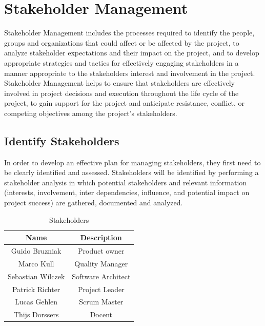 \section{Stakeholder Management}
\label{sec:stakeholders}

Stakeholder Management includes the processes required to identify the people, groups and organizations that could affect or be affected by the project, to analyze stakeholder expectations and their impact on the project, and to develop appropriate strategies and tactics for effectively engaging stakeholders in a manner appropriate to the stakeholders interest and involvement in the project. Stakeholder Management helps to ensure that stakeholders are effectively involved in project decisions and execution throughout the life cycle of the project, to gain support for the project and anticipate resistance, conflict, or competing objectives among the project’s stakeholders.

\subsection{Identify Stakeholders}

In order to develop an effective plan for managing stakeholders, they first need to be clearly identified and assessed. Stakeholders will be identified by performing a stakeholder analysis in which potential stakeholders and relevant information (interests, involvement, inter dependencies, influence, and potential impact on project success) are gathered, documented and analyzed. 


\begin{table}[H]
\centering
\begin{tabular}{|c|c|}
\hline
\cellcolor{gray}Name & \cellcolor{gray}Description \\ \hline
Guido Bruzniak & Product owner \\ \hline
Marco Kull & Quality Manager \\ \hline
Sebastian Wilczek & Software Architect \\ \hline
Patrick Richter & Project Leader \\ \hline
Lucas Gehlen & Scrum Master \\ \hline
Thijs Dorssers & Docent \\ \hline
\end{tabular}
\caption{Stakeholders}
\end{table}

